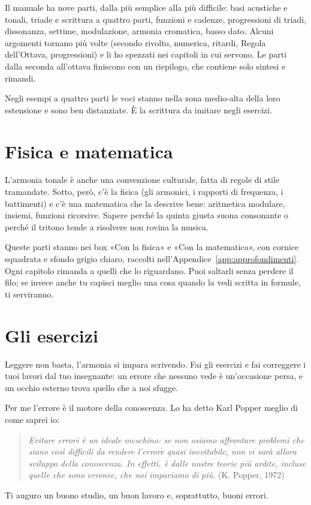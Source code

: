 Il manuale ha nove parti, dalla più semplice alla più difficile: basi acustiche e tonali, triade e scrittura a quattro parti, funzioni e cadenze, progressioni di triadi, dissonanza, settime, modulazione, armonia cromatica, basso dato. Alcuni argomenti tornano più volte (secondo rivolto, numerica, ritardi, Regola dell'Ottava, progressioni) e li ho spezzati nei capitoli in cui servono. Le parti dalla seconda all'ottava finiscono con un riepilogo, che contiene solo sintesi e rimandi.

Negli esempi a quattro parti le voci stanno nella zona medio-alta della loro estensione e sono ben distanziate. È la scrittura da imitare negli esercizi.

\section*{Fisica e matematica}

L'armonia tonale è anche una convenzione culturale, fatta di regole di stile tramandate. Sotto, però, c'è la fisica (gli armonici, i rapporti di frequenza, i battimenti) e c'è una matematica che la descrive bene: aritmetica modulare, insiemi, funzioni ricorsive. Sapere perché la quinta giusta suona consonante o perché il tritono tende a risolvere non rovina la musica.

Queste parti stanno nei box «Con la fisica» e «Con la matematica», con cornice squadrata e sfondo grigio chiaro, raccolti nell'Appendice~\ref{app:approfondimenti}. Ogni capitolo rimanda a quelli che lo riguardano. Puoi saltarli senza perdere il filo; se invece anche tu capisci meglio una cosa quando la vedi scritta in formule, ti serviranno.

\section*{Gli esercizi}

Leggere non basta, l'armonia si impara scrivendo. Fai gli esercizi e fai correggere i tuoi lavori dal tuo insegnante: un errore che nessuno vede è un'occasione persa, e un occhio esterno trova quello che a noi sfugge.

Per me l'errore è il motore della conoscenza. Lo ha detto Karl Popper meglio di come saprei io:

\begin{quote}
\emph{	Evitare errori è un ideale meschino: se non osiamo affrontare problemi che siano così difficili da rendere l'errore quasi inevitabile, non vi sarà allora sviluppo della conoscenza. In effetti, è dalle nostre teorie più ardite, incluse quelle che sono erronee, che noi impariamo di più.} (K. Popper, 1972)
\end{quote}

Ti auguro un buono studio, un buon lavoro e, soprattutto, buoni errori.
